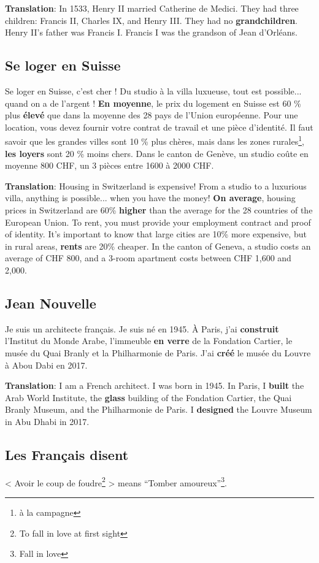 \documentclass[math,code]{amznotes}
\theoremstyle{remark}
\begin{document}
\textbf{Translation}: In 1533, Henry II married Catherine de Medici. They had three children: Francis II, Charles IX, and Henry III. They had no \textbf{grandchildren}. Henry II's father was Francis I. Francis I was the grandson of Jean d'Orléans.

\subsection*{Se loger en Suisse}
Se loger en Suisse, c'est cher ! Du studio à la villa luxueuse, tout est possible... quand on a de l'argent ! \textbf{En moyenne}, le prix du logement en Suisse est 60 \% plus \textbf{élevé} que dans la moyenne des 28 pays de l'Union européenne. Pour une location, vous devez fournir votre contrat de travail et une pièce d'identité. Il faut savoir que les grandes villes sont 10 \% plus chères, mais dans les zones rurales\footnote{à la campagne}, \textbf{les loyers} sont 20 \% moins chers. Dans le canton de Genève, un studio coûte en moyenne 800 CHF, un 3 pièces entre 1600 à 2000 CHF.

\textbf{Translation}: Housing in Switzerland is expensive! From a studio to a luxurious villa, anything is possible... when you have the money! \textbf{On average}, housing prices in Switzerland are 60\% \textbf{higher} than the average for the 28 countries of the European Union. To rent, you must provide your employment contract and proof of identity. It's important to know that large cities are 10\% more expensive, but in rural areas, \textbf{rents} are 20\% cheaper. In the canton of Geneva, a studio costs an average of CHF 800, and a 3-room apartment costs between CHF 1,600 and 2,000.

\subsection*{Jean Nouvelle}
Je suis un architecte français. Je suis né en 1945. À Paris, j'ai \textbf{construit} l'Institut du Monde Arabe, l'immeuble \textbf{en verre} de la Fondation Cartier, le musée du Quai Branly et la Philharmonie de Paris. J'ai \textbf{créé} le musée du Louvre à Abou Dabi en 2017.

\textbf{Translation}: I am a French architect. I was born in 1945. In Paris, I \textbf{built} the Arab World Institute, the \textbf{glass} building of the Fondation Cartier, the Quai Branly Museum, and the Philharmonie de Paris. I \textbf{designed} the Louvre Museum in Abu Dhabi in 2017.

\subsection*{Les Français disent}
< Avoir le coup de foudre\footnote{To fall in love at first sight} > means ``Tomber amoureux''\footnote{Fall in love}.
\end{document}
